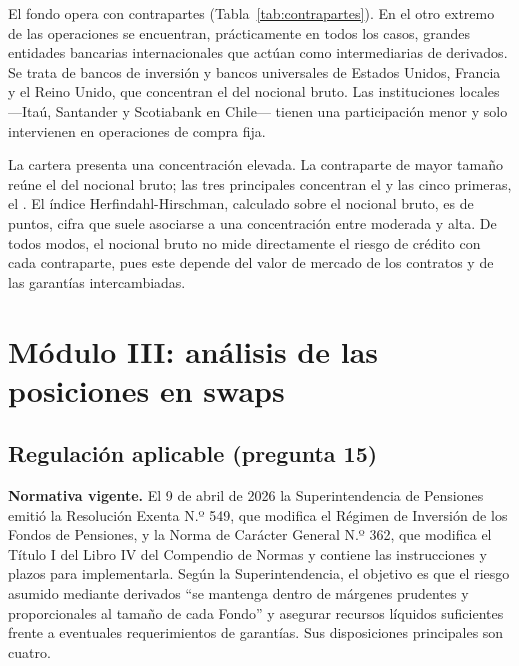 \documentclass[11pt,letterpaper]{article}
\begin{document}
El fondo opera con \MIIcontrapartes{} contrapartes (Tabla~\ref{tab:contrapartes}). En el otro extremo de las operaciones se encuentran, prácticamente en todos los casos, grandes entidades bancarias internacionales que actúan como intermediarias de derivados. Se trata de bancos de inversión y bancos universales de Estados Unidos, Francia y el Reino Unido, que concentran el \MIIextranjeras{} del nocional bruto. Las instituciones locales ---Itaú, Santander y Scotiabank en Chile--- tienen una participación menor y solo intervienen en operaciones de compra fija.

La cartera presenta una concentración elevada. La contraparte de mayor tamaño reúne el \MIItopUno{} del nocional bruto; las tres principales concentran el \MIItopTres{} y las cinco primeras, el \MIItopCinco{}. El índice Herfindahl-Hirschman, calculado sobre el nocional bruto, es de \MIIhhi{} puntos, cifra que suele asociarse a una concentración entre moderada y alta. De todos modos, el nocional bruto no mide directamente el riesgo de crédito con cada contraparte, pues este depende del valor de mercado de los contratos y de las garantías intercambiadas.

\section{Módulo III: análisis de las posiciones en swaps}

\subsection{Regulación aplicable (pregunta 15)}

\textbf{Normativa vigente.} El 9 de abril de 2026 la Superintendencia de Pensiones
emitió la Resolución Exenta N.º 549, que modifica el Régimen de Inversión de los Fondos
de Pensiones, y la Norma de Carácter General N.º 362, que modifica el Título I del
Libro IV del Compendio de Normas y contiene las instrucciones y plazos para
implementarla. Según la Superintendencia, el objetivo es que el riesgo asumido mediante
derivados ``se mantenga dentro de márgenes prudentes y proporcionales al tamaño de cada
Fondo'' y asegurar recursos líquidos suficientes frente a eventuales requerimientos de
garantías. Sus disposiciones principales son cuatro.
\end{document}
